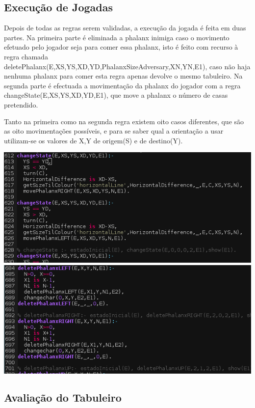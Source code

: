 \documentclass[a4paper]{article}
\begin{document}
\subsection{Execução de Jogadas}
Depois de todas as regras serem validadas, a execução da jogada é feita em duas partes. Na primeira parte é eliminada a phalanx inimiga caso o movimento efetuado pelo jogador seja para comer essa phalanx, isto é feito com recurso à regra chamada deletePhalanx(E,XS,YS,XD,YD,PhalanxSizeAdversary,XN,YN,E1), caso não haja nenhuma phalanx para comer esta regra apenas devolve o mesmo tabuleiro. Na segunda parte é efectuada a movimentação da phalanx do jogador com a regra changeState(E,XS,YS,XD,YD,E1), que move a phalanx o número de casas pretendido.

Tanto na primeira como na segunda regra existem oito casos diferentes, que são as oito movimentações possíveis, e para se saber qual a orientação a usar utilizam-se os valores de X,Y de origem(S) e de destino(Y).

\begin{center}
\includegraphics[scale=0.70]{jjj1.png}
\includegraphics[scale=0.70]{jjj2.png}
\end{center}

\subsection{Avaliação do Tabuleiro}
\end{document}
